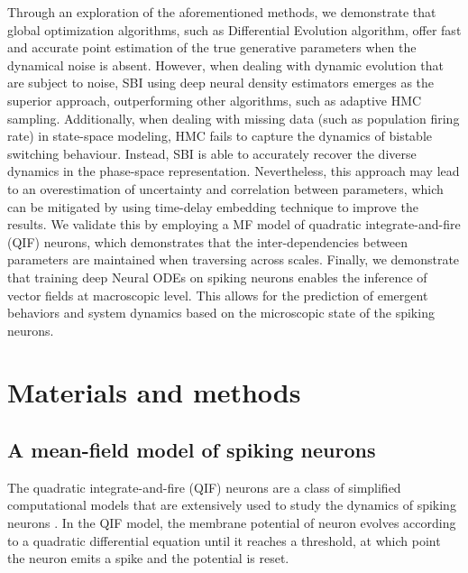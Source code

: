 \documentclass[preprint,11pt,authoryear]{elsarticle}
\begin{document}
Through an exploration of the aforementioned methods, we demonstrate that global optimization algorithms, such as Differential Evolution algorithm, offer fast and accurate point estimation of the true generative parameters when the dynamical noise is absent. However, when dealing with dynamic evolution that are subject to noise, SBI using deep neural density estimators emerges as the superior approach, outperforming other algorithms, such as adaptive HMC sampling. Additionally, when dealing with missing data (such as population firing rate) in state-space modeling, HMC fails to capture the dynamics of bistable switching behaviour. Instead, SBI is able to accurately recover the diverse dynamics in the phase-space representation. Nevertheless, this approach may lead to an overestimation of uncertainty and correlation between parameters, which can be mitigated by using time-delay embedding technique to improve the results. We validate this by employing a MF model of quadratic integrate-and-fire (QIF) neurons, which demonstrates that the inter-dependencies between parameters are maintained when traversing across scales. Finally, we demonstrate that training deep Neural ODEs on spiking neurons enables the inference of vector fields at macroscopic level. This allows for the prediction of emergent behaviors and system dynamics based on the microscopic state of the spiking neurons. 




\section{Materials and methods}
\label{Methods}

\subsection{A mean-field model of spiking neurons}

The quadratic integrate-and-fire (QIF) neurons are a class of simplified computational models that are extensively used to study the dynamics of spiking neurons \citep{Gerstner2002, Izhikevich2007}. In the QIF model, the membrane potential of neuron evolves according to a quadratic differential equation until it reaches a threshold, at which point the neuron emits a spike and the potential is reset.
\end{document}
